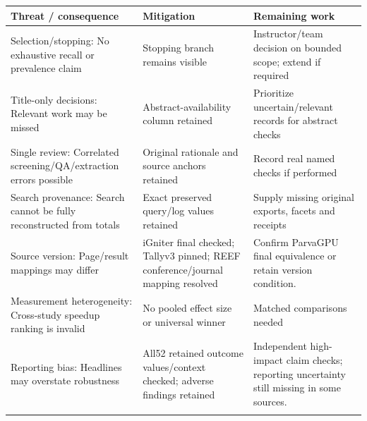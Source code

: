 \begin{longtable}{>{\raggedright\arraybackslash}p{}>{\raggedright\arraybackslash}p{}>{\raggedright\arraybackslash}p{}}
\toprule
\textbf{Threat / consequence} & \textbf{Mitigation} & \textbf{Remaining work}\\\midrule\endhead
Selection/stopping: No exhaustive recall or prevalence claim & Stopping branch remains visible & Instructor/team decision on bounded scope; extend if required\\\addlinespace
Title-only decisions: Relevant work may be missed & Abstract-availability column retained & Prioritize uncertain/relevant records for abstract checks\\\addlinespace
Single review: Correlated screening/QA/extraction errors possible & Original rationale and source anchors retained & Record real named checks if performed\\\addlinespace
Search provenance: Search cannot be fully reconstructed from totals & Exact preserved query/log values retained & Supply missing original exports, facets and receipts\\\addlinespace
Source version: Page/result mappings may differ & iGniter final checked; Tallyv3 pinned; REEF conference/journal mapping resolved & Confirm ParvaGPU final equivalence or retain version condition.\\\addlinespace
Measurement heterogeneity: Cross-study speedup ranking is invalid & No pooled effect size or universal winner & Matched comparisons needed\\\addlinespace
Reporting bias: Headlines may overstate robustness & All52 retained outcome values/context checked; adverse findings retained & Independent high-impact claim checks; reporting uncertainty still missing in some sources.\\\addlinespace
\bottomrule\end{longtable}
